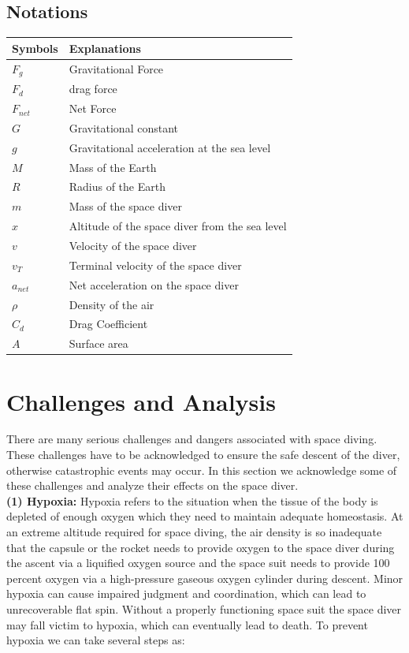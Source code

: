 \documentclass[a4paper, 14pt]{extarticle}
\begin{document}
\subsection{Notations}
\begin{table}[H]
\centering
\def\arraystretch{1.4}
\begin{tabular}{lp{4in}}
\hline
Symbols & Explanations \\ \hline
$F_g$ & Gravitational Force \\
$F_d$ & drag force \\
$F_{net}$ & Net Force \\
$G$ & Gravitational constant \\
$g$ & Gravitational acceleration at the sea level \\
$M$ & Mass of the Earth \\
$R$ & Radius of the Earth \\
$m$ & Mass of the space diver \\
$x$ & Altitude of the space diver from the sea level \\
$v$ & Velocity of the space diver \\
$v_T$ & Terminal velocity of the space diver \\
$a_{net}$ & Net acceleration on the space diver \\
$\rho$ & Density of the air \\
$C_d$ & Drag Coefficient \\ 
$A$ & Surface area\\
\hline
\end{tabular}
\end{table}
\section{Challenges and Analysis}
There are many serious challenges and dangers associated with space diving. These challenges have to be acknowledged to ensure the safe descent of the diver, otherwise catastrophic events may occur. In this section we acknowledge some of these challenges and analyze their effects on the space diver.\\
\textbf{(1) Hypoxia:} Hypoxia refers to the situation when the tissue of the body is depleted of enough oxygen which they need to maintain adequate homeostasis. At an extreme altitude required for space diving, the air density is so inadequate that the capsule or the rocket needs to provide oxygen to the space diver during the ascent via a liquified oxygen source and the space suit needs to provide 100 percent oxygen via a high-pressure gaseous oxygen cylinder during  descent. Minor hypoxia can cause impaired judgment and coordination, which can lead to unrecoverable flat spin. Without a properly functioning space suit the space diver may fall victim to hypoxia, which can eventually lead to death.
To prevent hypoxia we can take several steps as:
\end{document}
